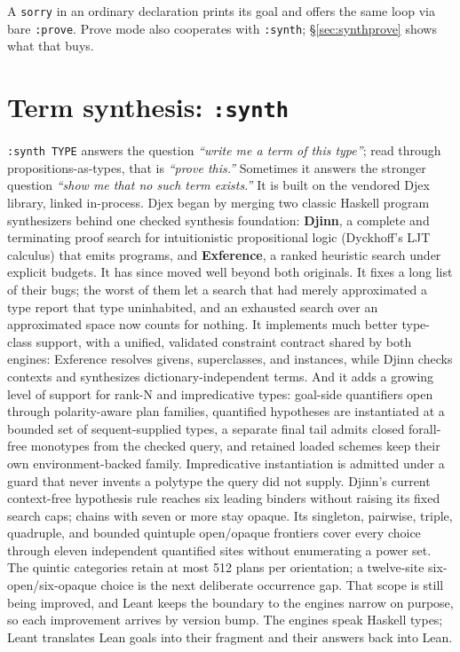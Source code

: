 \documentclass[11pt,oneside]{article}
\newcommand{\code}[1]{\texttt{#1}}
\begin{document}
A \code{sorry} in an ordinary declaration prints its goal and offers
the same loop via bare \code{:prove}. Prove mode also cooperates with
\code{:synth}; \S\ref{sec:synthprove} shows what that buys.

\section{Term synthesis: \code{:synth}}\label{sec:synth}

\code{:synth TYPE} answers the question \emph{``write me a term of
this type''}; read through propositions-as-types, that is
\emph{``prove this.''} Sometimes it answers the stronger question
\emph{``show me that no such term exists.''} It is built on the
vendored Djex library, linked in-process. Djex began by merging two
classic Haskell program synthesizers behind one checked synthesis
foundation: \textbf{Djinn}, a complete and terminating proof
search for intuitionistic propositional logic (Dyckhoff's LJT
calculus) that emits programs, and \textbf{Exference}, a ranked
heuristic search under explicit budgets. It has since moved well
beyond both originals. It fixes a long list of their bugs; the worst
of them let a search that had merely approximated a type report that
type uninhabited, and an exhausted search over an approximated space
now counts for nothing.
It implements much better type-class support, with a unified,
validated constraint contract shared by both engines: Exference
resolves givens, superclasses, and instances, while Djinn checks
contexts and synthesizes dictionary-independent terms. And it adds a
growing level of support for rank-N and impredicative types: goal-side
quantifiers open through polarity-aware plan families, quantified
hypotheses are instantiated at a bounded set of sequent-supplied
types, a separate final tail admits closed forall-free monotypes from
the checked query, and retained loaded schemes keep their own
environment-backed family. Impredicative instantiation is admitted under a
guard that never invents a polytype the query did not supply. Djinn's current
context-free hypothesis rule reaches six leading binders without
raising its fixed search caps; chains with seven or more stay opaque.
Its singleton, pairwise, triple, quadruple, and bounded quintuple open/opaque
frontiers cover every choice through eleven independent quantified sites
without enumerating a power set. The quintic categories retain at most 512
plans per orientation; a twelve-site six-open/six-opaque choice is the next
deliberate occurrence gap. That scope is still being
improved, and Leant keeps the boundary to the engines narrow on
purpose, so each improvement arrives by version bump. The engines speak Haskell types;
Leant translates Lean goals into their fragment and their answers back
into Lean.
\end{document}
